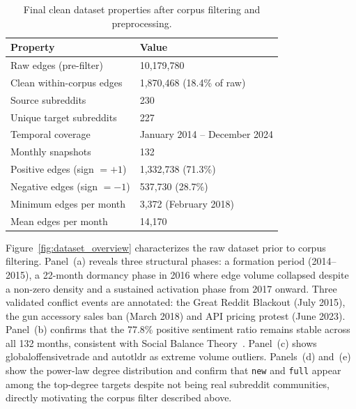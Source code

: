 \documentclass[a4paper,fleqn]{cas-dc}
\begin{document}
\begin{table}[h!]
\centering
\caption{Final clean dataset properties after corpus filtering and
         preprocessing.}
\label{tab:dataset}
\begin{tabular}{lp{3cm}}
\toprule
\textbf{Property} & \textbf{Value} \\
\midrule
Raw edges (pre-filter)       & 10{,}179{,}780 \\
Clean within-corpus edges    & 1{,}870{,}468 \;(18.4\% of raw) \\
Source subreddits            & 230 \\
Unique target subreddits     & 227 \\
Temporal coverage            & January 2014 -- December 2024 \\
Monthly snapshots            & 132 \\
Positive edges (sign $=+1$)  & 1{,}332{,}738 \;(71.3\%) \\
Negative edges (sign $=-1$)  & 537{,}730 \;(28.7\%) \\
Minimum edges per month      & 3{,}372 \;(February 2018) \\
Mean edges per month         & 14{,}170 \\
\bottomrule
\end{tabular}
\end{table}

Figure~\ref{fig:dataset_overview} characterizes the raw dataset prior to corpus filtering. Panel~(a) reveals three structural phases: a formation period (2014--2015), a 22-month dormancy phase in 2016 where edge volume collapsed despite a non-zero density and a sustained activation phase from 2017 onward. Three validated conflict events are annotated: the Great Reddit Blackout (July 2015), the gun accessory
sales ban (March 2018) and API pricing protest (June 2023). Panel~(b) confirms that the 77.8\% positive sentiment ratio remains
stable across all 132 months, consistent with Social Balance Theory~\cite{15_Heider1946}. Panel~(c) shows globaloffensivetrade and autotldr as extreme volume outliers. Panels~(d) and~(e) show the power-law degree distribution and confirm that \texttt{new} and \texttt{full} appear among the top-degree targets despite not being real subreddit
communities, directly motivating the corpus filter described above.
\end{document}

